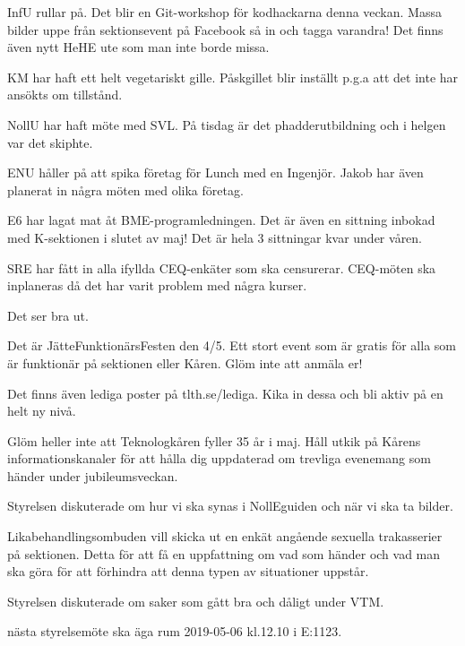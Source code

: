 \documentclass[10pt]{article}
\begin{document}
\begin{paragrafer}
\begin{paragrafer}
InfU rullar på. Det blir en Git-workshop för kodhackarna denna veckan. Massa bilder uppe   
    från sektionsevent på Facebook så in och tagga varandra! Det finns även nytt HeHE ute som man 
    inte borde missa.

KM har haft ett helt vegetariskt gille. Påskgillet blir inställt p.g.a att det inte har ansökts om tillstånd.

NollU har haft möte med SVL. På tisdag är det phadderutbildning och i helgen var det skiphte.

ENU håller på att spika företag för Lunch med en Ingenjör. Jakob har även planerat in några möten med olika företag.

E6 har lagat mat åt BME-programledningen. Det är även en sittning inbokad med K-sektionen i slutet
    av maj! Det är hela 3 sittningar kvar under våren.

SRE har fått in alla ifyllda CEQ-enkäter som ska censurerar. CEQ-möten ska inplaneras då det har varit problem
    med några kurser.

Det ser bra ut.

Det är JätteFunktionärsFesten den 4/5. Ett stort event som är gratis för alla som är funktionär på sektionen eller Kåren. Glöm inte att anmäla er!

Det finns även lediga poster på tlth.se/lediga. Kika in dessa och bli aktiv på en helt ny nivå.

Glöm heller inte att Teknologkåren fyller 35 år i maj. Håll utkik på Kårens informationskanaler för att 
    hålla dig uppdaterad om trevliga evenemang som händer under jubileumsveckan.

\end{paragrafer}

Styrelsen diskuterade om hur vi ska synas i NollEguiden och när vi ska ta bilder. 



Likabehandlingsombuden vill skicka ut en enkät angående sexuella trakasserier på sektionen. Detta för att 
    få en uppfattning om vad som händer och vad man ska göra för att förhindra att denna typen av situationer uppstår. 

Styrelsen diskuterade om saker som gått bra och dåligt under VTM.

\Mba nästa styrelsemöte ska äga rum 2019-05-06 kl.12.10 i E:1123.


\end{paragrafer}
\end{document}
